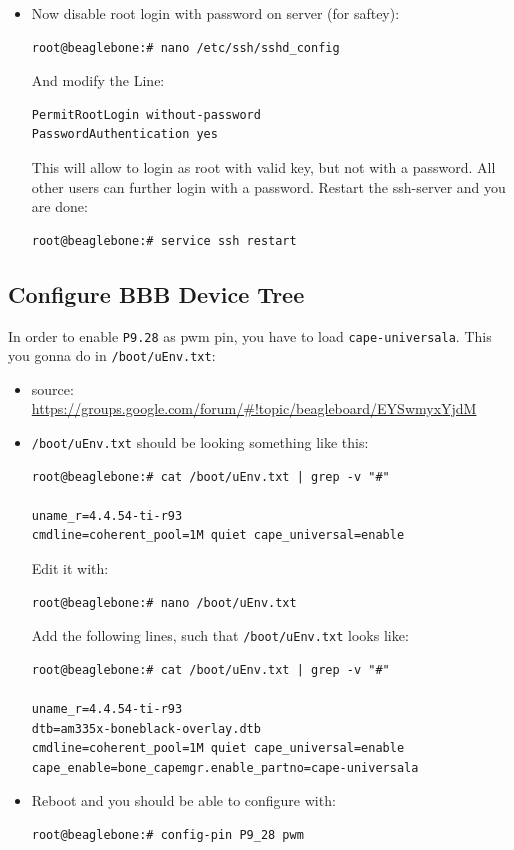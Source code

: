 \documentclass[
	fontsize=10pt
	paper=a4
]{scrartcl}
\begin{document}
\begin{itemize}
\item Now disable root login with password on server (for saftey):
\begin{lstlisting}
root@beaglebone:# nano /etc/ssh/sshd_config
\end{lstlisting}
And modify the Line:
\begin{lstlisting}
PermitRootLogin without-password
PasswordAuthentication yes
\end{lstlisting}
This will allow to login as root with valid key, but not with a password.
All other users can further login with a password.
Restart the ssh-server and you are done: 
\begin{lstlisting}
root@beaglebone:# service ssh restart
\end{lstlisting}
\end{itemize}



\subsection{Configure BBB Device Tree}

In order to enable \texttt{P9.28} as pwm pin, you have to load \texttt{cape-universala}. This you gonna do in \texttt{/boot/uEnv.txt}:

\begin{itemize}
\item source: \url{https://groups.google.com/forum/#!topic/beagleboard/EYSwmyxYjdM}

\item \texttt{/boot/uEnv.txt} should be looking something like this:

\begin{lstlisting}
root@beaglebone:# cat /boot/uEnv.txt | grep -v "#"

uname_r=4.4.54-ti-r93 
cmdline=coherent_pool=1M quiet cape_universal=enable
\end{lstlisting}

Edit it with:
\begin{lstlisting}
root@beaglebone:# nano /boot/uEnv.txt
\end{lstlisting}

Add the following lines, such that \texttt{/boot/uEnv.txt} looks like:
\begin{lstlisting}
root@beaglebone:# cat /boot/uEnv.txt | grep -v "#"

uname_r=4.4.54-ti-r93
dtb=am335x-boneblack-overlay.dtb
cmdline=coherent_pool=1M quiet cape_universal=enable
cape_enable=bone_capemgr.enable_partno=cape-universala
\end{lstlisting}
\item Reboot and you should be able to configure with:
\begin{lstlisting}
root@beaglebone:# config-pin P9_28 pwm
\end{lstlisting}
\end{itemize}
\end{document}
